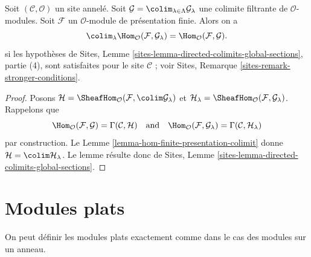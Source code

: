 \begin{lemma}
\label{lemma-finite-presentation-quasi-compact-colimit}
Soit $(\mathcal{C}, \mathcal{O})$ un site annelé.
Soit $\mathcal{G} = \colim_{\lambda \in \Lambda} \mathcal{G}_\lambda$ une
colimite filtrante de $\mathcal{O}$-modules.
Soit $\mathcal{F}$ un $\mathcal{O}$-module de présentation finie.
Alors on a
$$
\colim_\lambda \Hom_\mathcal{O}(\mathcal{F}, \mathcal{G}_\lambda)
=
\Hom_\mathcal{O}(\mathcal{F}, \mathcal{G}).
$$
si les hypothèses de Sites, Lemme
\ref{sites-lemma-directed-colimits-global-sections}, partie (4), sont
satisfaites pour le site $\mathcal{C}$ ; voir Sites, Remarque
\ref{sites-remark-stronger-conditions}.
\end{lemma}

\begin{proof}
Posons $\mathcal{H} =
\SheafHom_\mathcal{O}(\mathcal{F}, \colim \mathcal{G}_\lambda)$
et $\mathcal{H}_\lambda =
\SheafHom_\mathcal{O}(\mathcal{F}, \mathcal{G}_\lambda)$.
Rappelons que
$$
\Hom_\mathcal{O}(\mathcal{F}, \mathcal{G}) = \Gamma(\mathcal{C}, \mathcal{H})
\quad\text{and}\quad
\Hom_\mathcal{O}(\mathcal{F}, \mathcal{G}_\lambda) =
\Gamma(\mathcal{C}, \mathcal{H}_\lambda)
$$
par construction. Le Lemme \ref{lemma-hom-finite-presentation-colimit} donne
$\mathcal{H} = \colim \mathcal{H}_\lambda$. Le lemme résulte donc de Sites,
Lemme \ref{sites-lemma-directed-colimits-global-sections}.
\end{proof}
\section{Modules plats}

\label{section-flat}

\noindent
On peut définir les modules plats exactement comme dans le cas des modules sur un anneau.

